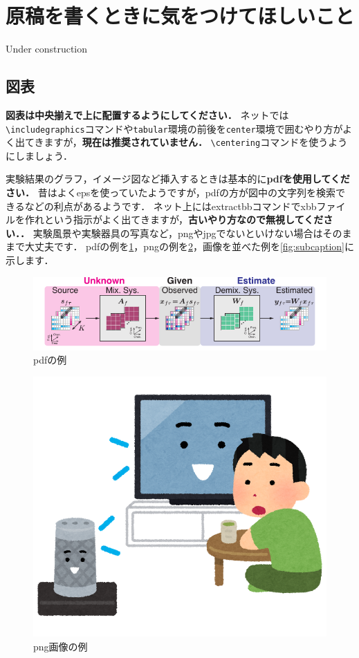 \section{原稿を書くときに気をつけてほしいこと}\label{sec:points}
Under construction

\subsection{図表}
\textbf{図表は中央揃えで上に配置するようにしてください．}
ネットでは\verb|\includegraphics|コマンドや\verb|tabular|環境の前後を\verb|center|環境で囲むやり方がよく出てきますが，\textbf{現在は推奨されていません．}
\verb|\centering|コマンドを使うようにしましょう．

実験結果のグラフ，イメージ図など挿入するときは基本的に\textbf{pdfを使用してください．}
昔はよくepsを使っていたようですが，pdfの方が図中の文字列を検索できるなどの利点があるようです．
ネット上にはextractbbコマンドでxbbファイルを作れという指示がよく出てきますが，\textbf{古いやり方なので無視してください．．}
実験風景や実験器具の写真など，pngやjpgでないといけない場合はそのままで大丈夫です．
pdfの例を\ref{fig:pdf}，pngの例を\ref{fig:png}，画像を並べた例を\ref{fig:subcaption}に示します．
\begin{figure}[t]
  \centering
  \includegraphics[scale=1.0]{fig/freq-domain-with-notation-en.pdf}
  \caption{pdfの例}\label{fig:pdf}
\end{figure}
\begin{figure}[t]
  \centering
  \includegraphics[width=.5\linewidth]{fig/smart_speaker_tv_talk.png}
  \caption{png画像の例}\label{fig:png}
\end{figure}
